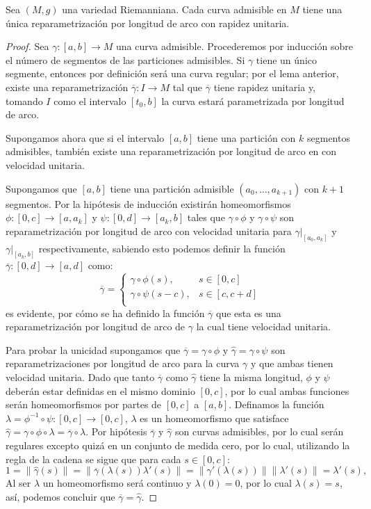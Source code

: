\begin{lemma}
	Sea $(M,g)$ una variedad Riemanniana. Cada curva admisible en $M$ tiene una única reparametrización por longitud de arco con rapidez unitaria.
\end{lemma}

\begin{proof}
	Sea $\gamma: [a,b] \to M$ una curva admisible. Procederemos por inducción sobre el número de segmentos de las particiones admisibles. Si $\gamma$ tiene un único segmente, entonces por definición será una curva regular; por el lema anterior, existe una reparametrización $\overline{\gamma}: I \to M$ tal que $\overline{\gamma}$ tiene rapidez unitaria y, tomando $I$ como el intervalo $[t_0, b]$ la curva estará parametrizada por longitud de arco.

	Supongamos ahora que si el intervalo $[a,b]$ tiene una partición con $k$ segmentos admisibles, también existe una reparametrización por longitud de arco en con velocidad unitaria.

	Supongamos que $[a,b]$ tiene una partición admisible $(a_0, \ldots, a_{k+1})$ con $k+1$ segmentos. Por la hipótesis de inducción existirán homeomorfismos $\phi : [0,c] \to [a, a_{k}]$ y $\psi: [0,d] \to [a_k, b]$ tales que $\gamma \circ \phi$ y $\gamma \circ \psi$ son reparametrización por longitud de arco con velocidad unitaria para $\gamma|_{[a_0,a_k]}$ y $\gamma|_{[a_k,b]}$ respectivamente, sabiendo esto podemos definir la función $\overline{\gamma}: [0,d] \to [a,d]$ como:
	\[
		\overline{\gamma} = \begin{cases}
			\gamma \circ \phi (s),   & s \in [0,c]      \\
			\gamma \circ \psi (s-c), & s \in [c, c + d] \\
		\end{cases}
	\]
	es evidente, por cómo se ha definido la función $\overline{\gamma}$ que esta es una reparametrización por longitud de arco de $\gamma$ la cual tiene velocidad unitaria.

	Para probar la unicidad supongamos que $\overline{\gamma} = \gamma \circ \phi$ y $\hat{\gamma} = \gamma \circ \psi$ son reparametrizaciones por longitud de arco para la curva $\gamma$ y que ambas tienen velocidad unitaria. Dado que tanto $\overline{\gamma}$ como $\hat{\gamma}$ tiene la misma longitud, $\phi$ y $\psi$ deberán estar definidas en el mismo dominio $[0,c]$, por lo cual ambas funciones serán homeomorfismos por partes de $[0,c]$ a $[a,b]$. Definamos la función $\lambda = \phi^{-1} \circ \psi : [0,c] \to [0,c]$, $\lambda$ es un homeomorfismo que satisface $\hat{\gamma} = \gamma \circ \phi \circ \lambda = \overline{\gamma} \circ \lambda$. Por hipótesis $\overline{\gamma}$ y $\hat{\gamma}$ son curvas admisibles, por lo cual serán regulares excepto quizá en un conjunto de medida cero, por lo cual, utilizando la regla de la cadena se sigue que para cada $s \in [0,c]$:
	\[
		1 = \| \hat{\gamma}(s)\| = \|\overline{\gamma}(\lambda(s)) \lambda'(s)\| = \|\gamma'(\lambda(s)) \| \| \lambda'(s) \| = \lambda'(s),
	\]
	Al ser $\lambda$ un homeomorfismo será continuo y $\lambda(0) = 0$, por lo cual $\lambda(s) = s$, así, podemos concluir que $\overline{\gamma} = \hat{\gamma}$.
\end{proof}

